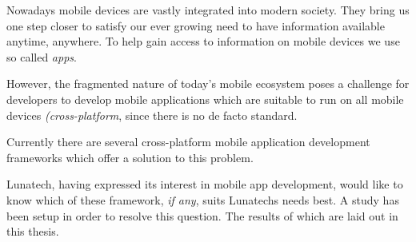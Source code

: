\samenvatting



Nowadays mobile devices are vastly integrated into modern society. They bring us one step closer to satisfy our ever growing need to have information available anytime, anywhere. To help gain access to information on mobile devices we use so called \emph{apps}. 

However, the fragmented nature of today's mobile ecosystem poses a challenge for developers to develop mobile applications which are suitable to run on all mobile devices \emph{(cross-platform}, since there is no de facto standard.

Currently there are several cross-platform mobile application development frameworks which offer a solution to this problem. 

Lunatech, having expressed its interest in mobile app development, would like to know which of these framework, \emph{if any}, suits Lunatechs needs best. A study has been setup in order to resolve this question. The results of which are laid out in this thesis.


